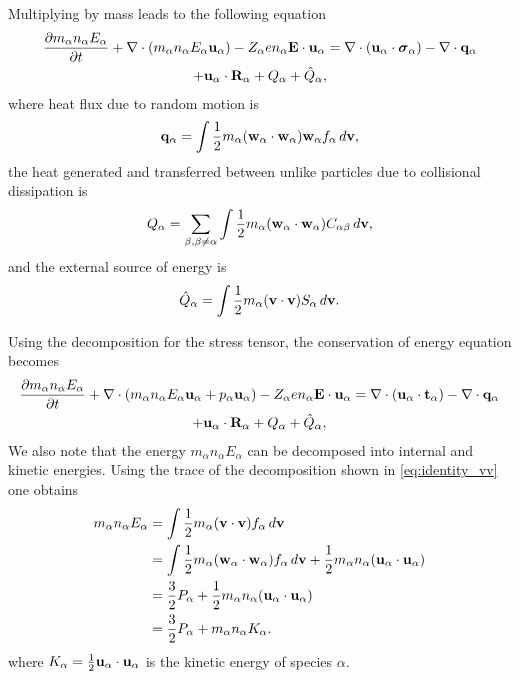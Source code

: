 \documentclass[oneside,a4paper,11pt]{report}
\newcommand*\widefbox[1]{\fbox{\hspace{0.2em}#1\hspace{0.2em}}}
\begin{document}
Multiplying by mass leads to the following equation
\begin{multline}
\label{eq:energy_derv_5}
\frac{\partial m_\alpha n_\alpha E_\alpha}{\partial t} + \nabla \cdot (m_\alpha n_\alpha E_\alpha \mathbf{u}_\alpha ) - Z_\alpha e n_\alpha \mathbf{E} \cdot \mathbf{u}_\alpha = \nabla \cdot ( \mathbf{u}_\alpha \cdot \boldsymbol{\sigma}_\alpha ) - \nabla \cdot \mathbf{q}_\alpha \\
+ \mathbf{u}_\alpha \cdot \mathbf{R}_\alpha + Q_{\alpha} + \hat{Q}_\alpha, 
\end{multline}
where heat flux due to random motion is
\begin{equation}
\mathbf{q}_\alpha = \int \frac{1}{2} m_\alpha (\mathbf{w}_\alpha \cdot \mathbf{w}_\alpha ) \mathbf{w}_\alpha f_\alpha \, d\mathbf{v},
\end{equation}
the heat generated and transferred between unlike particles due to collisional dissipation is 
\begin{equation}
Q_{\alpha} = \sum_{\beta,\beta \ne \alpha} \int \frac{1}{2} m_\alpha (\mathbf{w}_\alpha \cdot \mathbf{w}_\alpha) C_{\alpha \beta} \, d\mathbf{v},
\end{equation}
and the external source of energy is
\begin{equation}
\hat{Q}_\alpha = \int \frac{1}{2} m_\alpha (\mathbf{v} \cdot \mathbf{v}) S_\alpha \, d\mathbf{v}.
\end{equation}

Using the decomposition for the stress tensor, the conservation of energy equation becomes
\begin{multline}
\label{eq:energy_derv_6}
\frac{\partial m_\alpha n_\alpha E_\alpha}{\partial t} + \nabla \cdot (m_\alpha n_\alpha E_\alpha \mathbf{u}_\alpha + p_\alpha \mathbf{u}_\alpha ) - Z_\alpha e n_\alpha \mathbf{E} \cdot \mathbf{u}_\alpha = \nabla \cdot ( \mathbf{u}_\alpha \cdot \mathbf{t}_\alpha ) - \nabla \cdot \mathbf{q}_\alpha \\
+ \mathbf{u}_\alpha \cdot \mathbf{R}_\alpha + Q_{\alpha} + \hat{Q}_\alpha, 
\end{multline}
We also note that the energy $m_\alpha n_\alpha E_\alpha$ can be decomposed into internal and kinetic energies. Using the trace of the decomposition shown in \cref{eq:identity_vv} one obtains
\begin{align}
m_\alpha n_\alpha E_\alpha & = \int \frac{1}{2} m_\alpha (\mathbf{v} \cdot \mathbf{v}) f_\alpha \, d\mathbf{v} \nonumber \\
& = \int \frac{1}{2} m_\alpha (\mathbf{w}_\alpha \cdot \mathbf{w}_\alpha) f_\alpha \, d\mathbf{v} + \frac{1}{2} m_\alpha n_\alpha (\mathbf{u}_\alpha \cdot \mathbf{u}_\alpha) \nonumber \\
& = \frac{3}{2} P_\alpha + \frac{1}{2} m_\alpha n_\alpha (\mathbf{u}_\alpha \cdot \mathbf{u}_\alpha) \nonumber \\
& = \frac{3}{2} P_\alpha + m_\alpha n_\alpha K_\alpha.
\end{align}
where $K_\alpha = \frac{1}{2} \mathbf{u}_\alpha \cdot \mathbf{u}_\alpha$ is the kinetic energy of species $\alpha$.
\end{document}
